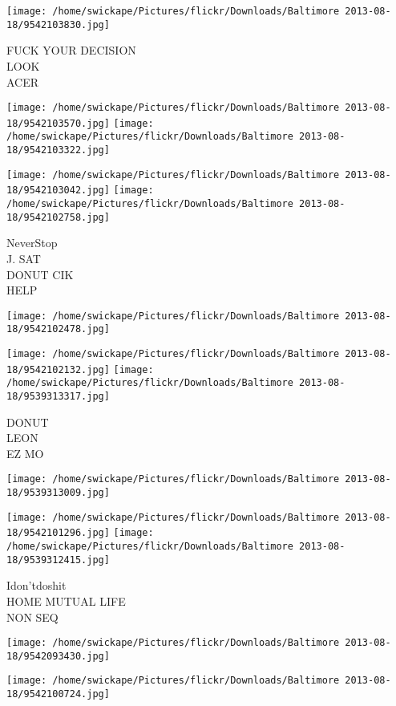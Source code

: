 \documentclass[10pt,letterpaper]{article}
\begin{document}
\vspace{0.25in}
\texttt{[image: /home/swickape/Pictures/flickr/Downloads/Baltimore 2013-08-18/9542103830.jpg]}

FUCK YOUR DECISION\\
LOOK\\
ACER
\pagebreak

\texttt{[image: /home/swickape/Pictures/flickr/Downloads/Baltimore 2013-08-18/9542103570.jpg]}
\texttt{[image: /home/swickape/Pictures/flickr/Downloads/Baltimore 2013-08-18/9542103322.jpg]}

\texttt{[image: /home/swickape/Pictures/flickr/Downloads/Baltimore 2013-08-18/9542103042.jpg]}
\texttt{[image: /home/swickape/Pictures/flickr/Downloads/Baltimore 2013-08-18/9542102758.jpg]}

NeverStop\\
J. SAT\\
DONUT CIK\\
HELP
\pagebreak

\texttt{[image: /home/swickape/Pictures/flickr/Downloads/Baltimore 2013-08-18/9542102478.jpg]}

\vspace{0.25in}
\texttt{[image: /home/swickape/Pictures/flickr/Downloads/Baltimore 2013-08-18/9542102132.jpg]}
\texttt{[image: /home/swickape/Pictures/flickr/Downloads/Baltimore 2013-08-18/9539313317.jpg]}

DONUT\\
LEON\\
EZ MO
\pagebreak

\texttt{[image: /home/swickape/Pictures/flickr/Downloads/Baltimore 2013-08-18/9539313009.jpg]}

\vspace{0.25in}
\texttt{[image: /home/swickape/Pictures/flickr/Downloads/Baltimore 2013-08-18/9542101296.jpg]}
\texttt{[image: /home/swickape/Pictures/flickr/Downloads/Baltimore 2013-08-18/9539312415.jpg]}

Idon'tdoshit\\
HOME MUTUAL LIFE\\
NON SEQ
\pagebreak

\texttt{[image: /home/swickape/Pictures/flickr/Downloads/Baltimore 2013-08-18/9542093430.jpg]}

\vspace{0.25in}
\texttt{[image: /home/swickape/Pictures/flickr/Downloads/Baltimore 2013-08-18/9542100724.jpg]}
\end{document}
